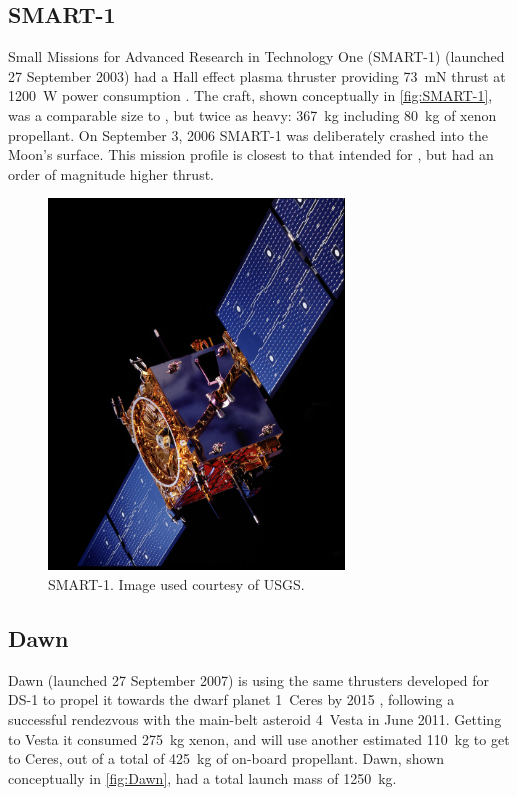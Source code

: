 \subsection{SMART-1}
Small Missions for Advanced Research in Technology One (SMART-1) (launched 27 September 2003) had a Hall effect plasma thruster providing 73~mN thrust at 1200~W power consumption \parencite{web_SMART-1}. The craft, shown conceptually in \autoref{fig:SMART-1}, was a comparable size to \BW, but twice as heavy: 367~kg including 80~kg of xenon propellant. On September 3, 2006 SMART-1 was deliberately crashed into the Moon's surface. This mission profile is closest to that intended for \BW, but had an order of magnitude higher thrust.

\begin{figure}[ht]
  \begin{center}
  \includegraphics [angle=90,width=0.7\textwidth] {Images/SMART-1.jpg}
  \end{center}
  \caption{SMART-1. Image used courtesy of USGS.}
  \label{fig:SMART-1}
\end{figure}

\subsection{Dawn}
Dawn (launched 27 September 2007) is using the same thrusters developed for DS-1 to propel it towards the dwarf planet 1~Ceres by 2015 \parencite{web_Dawn}, following a successful rendezvous with the main-belt asteroid 4~Vesta in June 2011. Getting to Vesta it consumed 275~kg xenon, and will use another estimated 110~kg to get to Ceres, out of a total of 425~kg of on-board propellant. Dawn, shown conceptually in \autoref{fig:Dawn}, had a total launch mass of 1250~kg.

